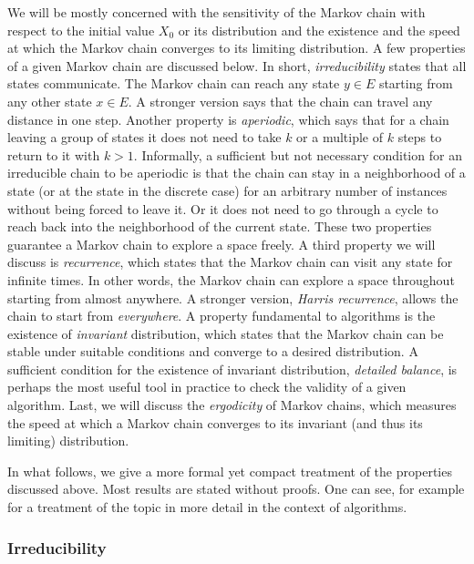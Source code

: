 We will be mostly concerned with the sensitivity of the Markov chain with
respect to the initial value $X_0$ or its distribution and the existence and
the speed at which the Markov chain converges to its limiting distribution. A
few properties of a given Markov chain are discussed below. In short,
\emph{irreducibility} states that all states communicate. The Markov chain can
reach any state $y\in E$ starting from any other state $x\in E$. A stronger
version says that the chain can travel any distance in one step. Another
property is \emph{aperiodic}, which says that for a chain leaving a group of
states it does not need to take $k$ or a multiple of $k$ steps to return to it
with $k>1$. Informally, a sufficient but not necessary condition for an
irreducible chain to be aperiodic is that the chain can stay in a neighborhood
of a state (or at the state in the discrete case) for an arbitrary number of
instances without being forced to leave it. Or it does not need to go through
a cycle to reach back into the neighborhood of the current state. These two
properties guarantee a Markov chain to explore a space freely. A third
property we will discuss is \emph{recurrence}, which states that the Markov
chain can visit any state for infinite times. In other words, the Markov chain
can explore a space throughout starting from almost anywhere. A stronger
version, \emph{Harris recurrence}, allows the chain to start from
\emph{everywhere}. A property fundamental to \mcmc algorithms is the existence
of \emph{invariant} distribution, which states that the Markov chain can be
stable under suitable conditions and converge to a desired distribution. A
sufficient condition for the existence of invariant distribution,
\emph{detailed balance}, is perhaps the most useful tool in practice to check
the validity of a given algorithm. Last, we will discuss the \emph{ergodicity}
of Markov chains, which measures the speed at which a Markov chain converges
to its invariant (and thus its limiting) distribution.

In what follows, we give a more formal yet compact treatment of the properties
discussed above. Most results are stated without proofs. One can see, for
example \cite[][chap.~6]{Robert:2004tn} for a treatment of the topic in more
detail in the context of \mcmc algorithms.

\subsubsection{Irreducibility}
\label{ssub:Irreducibility}

